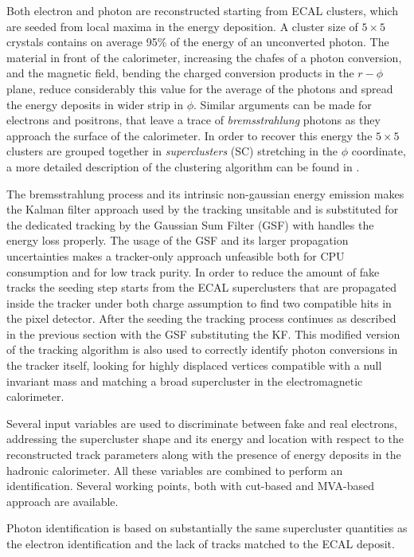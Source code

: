 Both electron and photon are reconstructed starting from ECAL clusters, which are seeded from local maxima in the energy deposition. A cluster size of $5\times5$ crystals contains on average 95\% of the energy of an unconverted photon. The material in front of the calorimeter, increasing the chafes of a photon conversion, and the magnetic field, bending the charged conversion products in the $r-\phi$ plane, reduce considerably this value for the average of the photons and spread the energy deposits in wider strip in $\phi$. Similar arguments can be made for electrons and positrons, that leave a trace of \emph{bremsstrahlung} photons as they approach the surface of the calorimeter. In order to recover this energy the $5\times5$ clusters are grouped together in \emph{superclusters} (SC) stretching in the $\phi$ coordinate, a more detailed description of the clustering algorithm can be found in \cite{CMS:2006tdr1}.

The bremsstrahlung process and its intrinsic non-gaussian energy emission makes the Kalman filter approach used by the tracking unsitable and is substituted for the dedicated tracking by the Gaussian Sum Filter (GSF) \cite{gsf} with handles the energy loss properly. The usage of the GSF and its larger propagation uncertainties makes a tracker-only approach unfeasible both for CPU consumption and for low track purity. In order to reduce the amount of fake tracks the seeding step starts from the ECAL superclusters that are propagated inside the tracker under both charge assumption to find two compatible hits in the pixel detector. After the seeding the tracking process continues as described in the previous section with the GSF substituting the KF. This modified version of the tracking algorithm is also used to correctly identify photon conversions in the tracker itself, looking for highly displaced vertices compatible with a null invariant mass and matching a broad supercluster in the electromagnetic calorimeter.

Several input variables are used to discriminate between fake and real electrons, addressing the supercluster shape and its energy and location with respect to the reconstructed track parameters along with the presence of energy deposits in the hadronic calorimeter. All these variables are combined to perform an identification. Several working points, both with cut-based and MVA-based approach are available.

Photon identification is based on substantially the same supercluster quantities as the electron identification and the lack of tracks matched to the ECAL deposit.  

